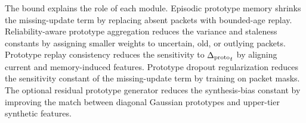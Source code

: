 The bound explains the role of each \ehsfp module. Episodic prototype memory shrinks the missing-update term by replacing absent packets with bounded-age replay. Reliability-aware prototype aggregation reduces the variance and staleness constants by assigning smaller weights to uncertain, old, or outlying packets. Prototype replay consistency reduces the sensitivity to ${\Delta_{\mathrm{proto}}}_t$ by aligning current and memory-induced features. Prototype dropout regularization reduces the sensitivity constant of the missing-update term by training on packet masks. The optional residual prototype generator reduces the synthesis-bias constant by improving the match between diagonal Gaussian prototypes and upper-tier synthetic features.
